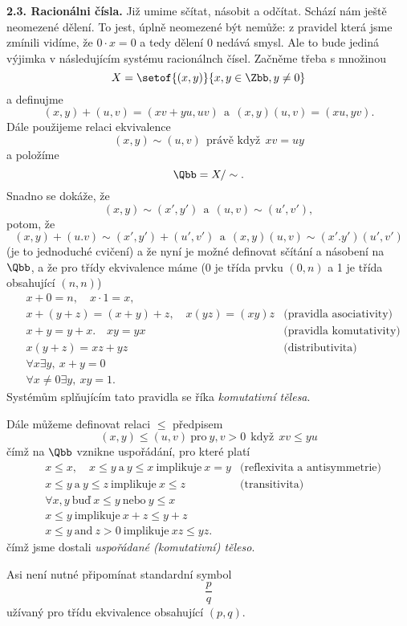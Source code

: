 \documentclass[12pt]{article}
\begin{document}
 {\bf 2.3. Racionálni čísla.}  Již umime sčítat, násobit a odčítat. Schází nám ještě neomezené dělení. To jest, úplně neomezené být nemůže: z pravidel která jsme zmínili  vidíme, že $0\cdot x=0$ a tedy dělení  $0$ nedává smysl. Ale to bude jediná výjimka v následujícím systému racionálnch čísel. Začněme třeba s množinou 
 $$
 X=\setof{(x,y)}{x,y\in\Zbb, y\neq 0}
 $$
 a definujme
 $$
 (x,y)+(u,v)=(xv+yu,uv)\ \ \text{a}\ \ (x,y)(u,v)=(xu,yv).
 $$
 Dále použijeme relaci ekvivalence
 $$
 (x,y)\sim (u,v)  \ \ \text{právě když}\ \ xv=uy
 $$
 a položíme 
 $$
 \Qbb=X/\sim.
 $$
 Snadno se dokáže, že
 $$
 (x,y)\sim(x',y')\ \ \text{a}\ \ (u,v)\sim(u',v'),
 $$
 potom, že
 $$
 (x,y)+(u.v)\sim(x',y')+(u',v')\ \ \text{a}\ \ (x,y)(u,v)\sim(x'.y')(u',v')
 $$
 (je to jednoduché cvičení) a že nyní je možné definovat sčítání a násobení na $\Qbb$, a že pro třídy ekvivalence máme
 (0 je třída prvku $(0,n)$ a 1 je třída obsahující $(n,n)$)
$$
 \begin{aligned}
 &x+0=n, \quad x\cdot 1=x,&\\
 &x+(y+z)=(x+y)+z, \quad x(yz)=(xy)z &\text{(pravidla asociativity)}\\
 &x+y=y+x. \quad xy=yx &\text{(pravidla komutativity)}\\
 &x(y+z)=xz+yz &\text{(distributivita)}\\
 &\forall x\exists y, \ x+y=0\\
 &\forall x\neq 0\exists y, \ xy=1.
  \end{aligned}
 $$
 Systémům splňujícím tato pravidla se říka {\em komutativní tělesa}.
 
 Dále můžeme definovat relaci $\leq$ předpisem
 $$
 (x,y)\leq (u,v) \ \text{pro}\ y,v>0 \ \ \text{kdy\v z}\ \ xv\leq yu
 $$
 čímž na $\Qbb$ vznikne uspořádání, pro které platí
$$
 \begin{aligned}
  &x\leq x,\quad x\leq y\ \text{a}\ y\leq x\ \text{implikuje} \ x=y &\text{(reflexivita a antisymmetrie)}\\
 &x\leq y \ \text{a}\ y\leq z\ \text{implikuje}\ x\leq z &\text{(transitivita)}\\
 &\forall x,y \ \text{buď}\ x\leq y\ \text{nebo}\ y\leq x\\
 &x\leq y \  \text{implikuje} \ x+z\leq y+z\\
 &x\leq y\ \text{and}\ z>0 \  \text{implikuje} \ xz\leq yz.
 \end{aligned}
 $$
 čímž jsme dostali  {\em uspořádané (komutativní) těleso}.
 
 Asi není nutné připomínat standardní symbol
 $$
 \frac pq
 $$
 užívaný pro třídu ekvivalence obsahující $(p,q)$.
 
\end{document}
